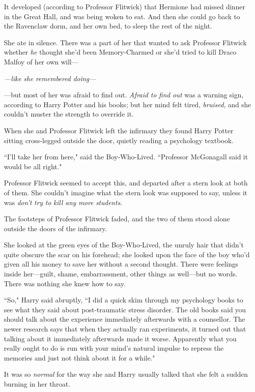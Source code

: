 It developed (according to Professor Flitwick) that Hermione had missed dinner in the Great Hall, and was being woken to eat. And then she could go back to the Ravenclaw dorm, and her own bed, to sleep the rest of the night.

She ate in silence. There was a part of her that wanted to ask Professor Flitwick whether \emph{he} thought she'd been Memory-Charmed or she'd tried to kill Draco Malfoy of her own will—

\emph{—like she remembered doing—}

—but most of her was afraid to find out. \emph{Afraid to find out} was a warning sign, according to Harry Potter and his books; but her mind felt tired, \emph{bruised}, and she couldn't muster the strength to override it.

When she and Professor Flitwick left the infirmary they found Harry Potter sitting cross-legged outside the door, quietly reading a psychology textbook.

``I'll take her from here," said the Boy-Who-Lived. ``Professor McGonagall said it would be all right."

Professor Flitwick seemed to accept this, and departed after a stern look at both of them. She couldn't imagine what the stern look was supposed to say, unless it was \emph{don't try to kill any more students}.

The footsteps of Professor Flitwick faded, and the two of them stood alone outside the doors of the infirmary.

She looked at the green eyes of the Boy-Who-Lived, the unruly hair that didn't quite obscure the scar on his forehead; she looked upon the face of the boy who'd given all his money to save her without a second thought. There were feelings inside her—guilt, shame, embarrassment, other things as well—but no words. There was nothing she knew how to say.

``So," Harry said abruptly, ``I did a quick skim through my psychology books to see what they said about post-traumatic stress disorder. The old books said you should talk about the experience immediately afterwards with a counsellor. The newer research says that when they actually ran experiments, it turned out that talking about it immediately afterwards made it worse. Apparently what you really ought to do is run with your mind's natural impulse to repress the memories and just not think about it for a while."

It was so \emph{normal} for the way she and Harry usually talked that she felt a sudden burning in her throat.

